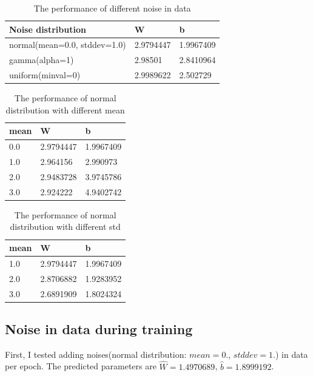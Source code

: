 \documentclass{article}
\begin{document}
\begin{table}[!h]
  \caption{The performance of different noise in data}
  \label{noise}
  \centering
  \begin{tabular}{lll}
    \toprule
    Noise distribution     & W     & b  \\
    \midrule
    normal(mean=0.0, stddev=1.0)     & 2.9794447 & 1.9967409    \\
    gamma(alpha=1)    & 2.98501      & 2.8410964  \\
    uniform(minval=0)    &2.9989622  &2.502729\\
    \bottomrule
  \end{tabular}
\end{table}

\begin{table}[!h]
  \caption{The performance of normal distribution with different mean}
  \label{normal1}
  \centering
  \begin{tabular}{lll}
    \toprule
    mean    & W     & b  \\
    \midrule
    0.0     & 2.9794447 & 1.9967409    \\
    1.0    & 2.964156 & 2.990973  \\
    2.0    &2.9483728 &3.9745786\\
    3.0    &2.924222 &4.9402742\\
    \bottomrule
  \end{tabular}
\end{table}

\begin{table}[!h]
  \caption{The performance of normal distribution with different std}
  \label{normal2}
  \centering
  \begin{tabular}{lll}
    \toprule
    mean    & W     & b  \\
    \midrule
    1.0    & 2.9794447 & 1.9967409 \\
    2.0    &2.8706882 &1.9283952\\
    3.0    &2.6891909 &1.8024324\\
    \bottomrule
  \end{tabular}
\end{table}

\subsection{Noise in data during training}
First, I tested adding noises(normal distribution: $mean = 0.$, $stddev=1.$) in data per epoch. The predicted parameters are $\hat{W }= 1.4970689$, $\hat{b}=1.8999192$.
\end{document}
